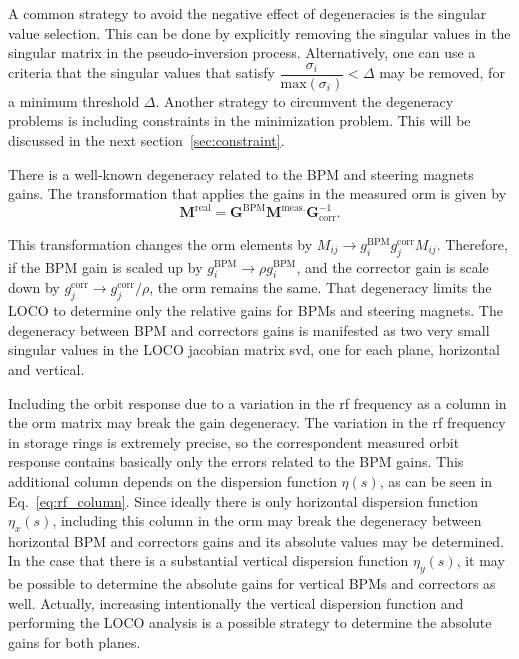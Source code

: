 A common strategy to avoid the negative effect of degeneracies is the singular value selection. This can be done by explicitly removing the singular values in the singular matrix in the pseudo-inversion process. Alternatively, one can use a criteria that the singular values that satisfy $\dfrac{\sigma_i}{\mathrm{max}\left(\sigma_i\right)} < \Delta$ may be removed, for a minimum threshold $\Delta$. Another strategy to circumvent the degeneracy problems is including constraints in the minimization problem. This will be discussed in the next section~\ref{sec:constraint}. 

There is a well-known degeneracy related to the BPM and steering magnets gains. The transformation that applies the gains in the measured \gls{orm} is given by 
\begin{equation}
    \mathbf{M}^{\mathrm{real}} = \mathbf{G}^{\mathrm{BPM}} \mathbf{M}^{\mathrm{meas.}}\mathbf{G}^{-1}_{\mathrm{corr}}.
\end{equation}

This transformation changes the \gls{orm} elements by $M_{ij} \rightarrow g_{i}^{\mathrm{BPM}}g_{j}^{\mathrm{corr}}M_{ij}$. Therefore, if the BPM gain is scaled up by $g_{i}^{\mathrm{BPM}} \rightarrow \rho g_{i}^{\mathrm{BPM}}$, and the corrector gain is scale down by $g_{j}^{\mathrm{corr}} \rightarrow g_{j}^{\mathrm{corr}}/\rho$, the \gls{orm} remains the same. That degeneracy limits the LOCO to determine only the relative gains for BPMs and steering magnets. The degeneracy between BPM and correctors gains is manifested as two very small singular values in the LOCO jacobian matrix \gls{svd}, one for each plane, horizontal and vertical.

Including the orbit response due to a variation in the \gls{rf} frequency as a column in the \gls{orm} matrix may break the gain degeneracy. The variation in the \gls{rf} frequency in storage rings is extremely precise, so the correspondent measured orbit response contains basically only the errors related to the BPM gains. This additional column depends on the dispersion function $\eta(s)$, as can be seen in Eq.~\eqref{eq:rf_column}. Since ideally there is only horizontal dispersion function $\eta_x(s)$, including this column in the \gls{orm} may break the degeneracy between horizontal BPM and correctors gains and its absolute values may be determined. In the case that there is a substantial vertical dispersion function $\eta_y(s)$, it may be possible to determine the absolute gains for vertical BPMs and correctors as well. Actually, increasing intentionally the vertical dispersion function and performing the LOCO analysis is a possible strategy to determine the absolute gains for both planes.
